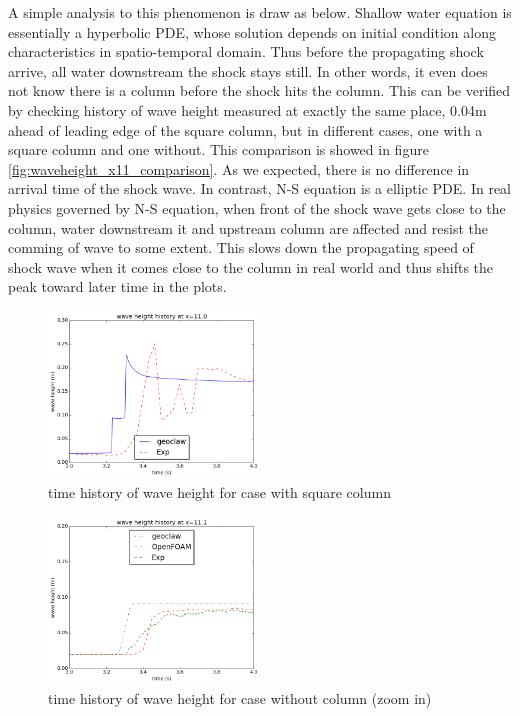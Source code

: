\documentclass[11pt]{article}
\begin{document}
\par
A simple analysis to this phenomenon is draw as below.
Shallow water equation is essentially a hyperbolic PDE, whose solution depends on initial condition along characteristics in spatio-temporal domain. 
Thus before the propagating shock arrive, all water downstream the shock stays still. 
In other words, it even does not know there is a column before the shock hits the column.
This can be verified by checking history of wave height measured at exactly the same place, 0.04m ahead of leading edge of the square column, but in different cases, one with a square column and one without.
This comparison is showed in figure \ref{fig:waveheight_x11_comparison}. As we expected, there is no difference in arrival time of the shock wave.
In contrast, N-S equation is a elliptic PDE. 
In real physics governed by N-S equation, when front of the shock wave gets close to the column, water downstream it and upstream column are affected and resist the comming of wave to some extent. 
This slows down the propagating speed of shock wave when it comes close to the column in real world and thus shifts the peak toward later time in the plots.
\begin{figure}[h!]
    \centering
    \includegraphics[width=0.5\textwidth]{./plots/waveheight_square_x11}
    \caption{time history of wave height for case with square column}
    \label{fig:waveheight_square_x=11.0}
\end{figure}
\begin{figure}[h!]
    \centering
    \includegraphics[width=0.5\textwidth]{./plots/waveheight_nocolumn_zoomin}
    \caption{time history of wave height for case without column (zoom in)}
    \label{fig:waveheight_nocolumn_zoomin}
\end{figure}
\end{document}
